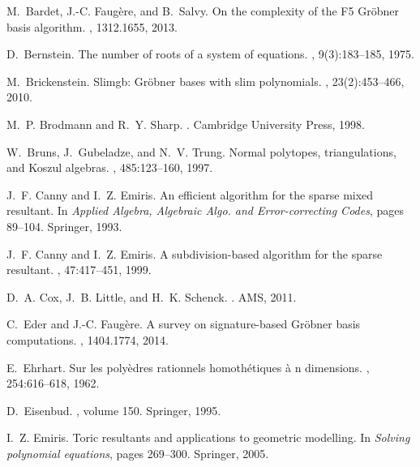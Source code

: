 \documentclass[12pt]{article}
\numberwithin{equation}{section}
\numberwithin{theorem}{section}
\begin{document}
\begin{thebibliography}{10}

M.~Bardet, J.-C. Faug{\`e}re, and B.~Salvy.
\newblock On the complexity of the {F5} {G}r{\"o}bner basis algorithm.
, 1312.1655, 2013.

D.~Bernstein.
\newblock The number of roots of a system of equations.
, 9(3):183--185, 1975.

M.~Brickenstein.
\newblock Slimgb: Gr{\"o}bner bases with slim polynomials.
, 23(2):453--466, 2010.

M.~P. Brodmann and R.~Y. Sharp.
.
\newblock Cambridge University Press, 1998.

W.~Bruns, J.~Gubeladze, and N.~V. Trung.
\newblock Normal polytopes, triangulations, and {K}oszul algebras.
, 485:123--160, 1997.

J.~F. Canny and I.~Z. Emiris.
\newblock An efficient algorithm for the sparse mixed resultant.
\newblock In {\em Applied Algebra, Algebraic Algo. and Error-correcting Codes},
  pages 89--104. Springer, 1993.

J.~F. Canny and I.~Z. Emiris.
\newblock A subdivision-based algorithm for the sparse resultant.
, 47:417--451, 1999.

D.~A. Cox, J.~B. Little, and H.~K. Schenck.
.
\newblock AMS, 2011.

C.~Eder and J.-C. Faug\`ere.
\newblock A survey on signature-based {G}r\"obner basis computations.
, 1404.1774, 2014.

E.~Ehrhart.
\newblock Sur les poly{\`e}dres rationnels homoth{\'e}tiques {\`a} n
  dimensions.
, 254:616--618, 1962.

D.~Eisenbud.
,
  volume 150.
\newblock Springer, 1995.

I.~Z. Emiris.
\newblock Toric resultants and applications to geometric modelling.
\newblock In {\em Solving polynomial equations}, pages 269--300. Springer,
  2005.


\end{thebibliography}
\end{document}
